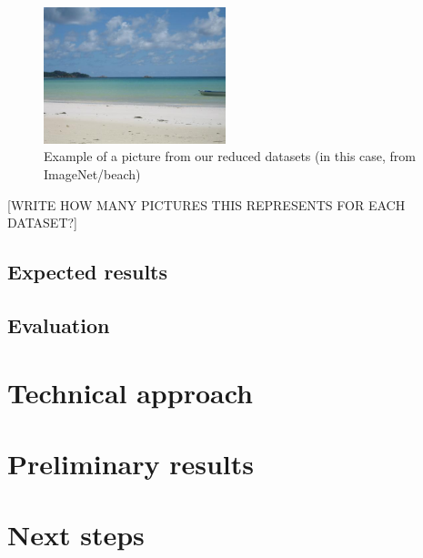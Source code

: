 \documentclass[10pt,twocolumn,letterpaper]{article}
\begin{document}
\begin{figure}
\begin{center}
\includegraphics[width=200px]{img/beach.jpg}
\caption{Example of a picture from our reduced datasets (in this case, from ImageNet/beach)}
\label{inex}
\end{center}
\end{figure}

[WRITE HOW MANY PICTURES THIS REPRESENTS FOR EACH DATASET?]

\subsection{Expected results}

\subsection{Evaluation}

\section{Technical approach}

\section{Preliminary results}

\section{Next steps}

{\small


}
\end{document}
